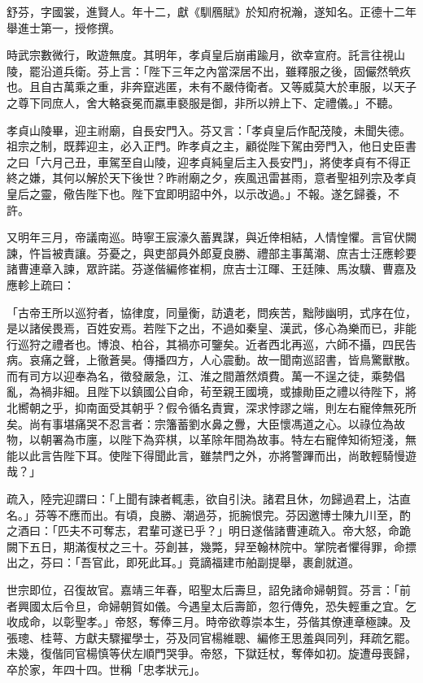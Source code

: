 \begin{pinyinscope}
舒芬，字國裳，進賢人。年十二，獻《馴鴈賦》於知府祝瀚，遂知名。正德十二年舉進士第一，授修撰。

時武宗數微行，畋遊無度。其明年，孝貞皇后崩甫踰月，欲幸宣府。託言往視山陵，罷沿道兵衛。芬上言：「陛下三年之內當深居不出，雖釋服之後，固儼然煢疚也。且自古萬乘之重，非奔竄逃匿，未有不嚴侍衛者。又等威莫大於車服，以天子之尊下同庶人，舍大輅袞冕而羸車褻服是御，非所以辨上下、定禮儀。」不聽。

孝貞山陵畢，迎主祔廟，自長安門入。芬又言：「孝貞皇后作配茂陵，未聞失德。祖宗之制，既葬迎主，必入正門。昨孝貞之主，顧從陛下駕由旁門入，他日史臣書之曰「六月己丑，車駕至自山陵，迎孝貞純皇后主入長安門」，將使孝貞有不得正終之嫌，其何以解於天下後世？昨祔廟之夕，疾風迅雷甚雨，意者聖祖列宗及孝貞皇后之靈，儆告陛下也。陛下宜即明詔中外，以示改過。」不報。遂乞歸養，不許。

又明年三月，帝議南巡。時寧王宸濠久蓄異謀，與近倖相結，人情惶懼。言官伏闕諫，忤旨被責讓。芬憂之，與吏部員外郎夏良勝、禮部主事萬潮、庶吉士汪應軫要諸曹連章入諫，眾許諾。芬遂偕編修崔桐，庶吉士江暉、王廷陳、馬汝驥、曹嘉及應軫上疏曰：

「古帝王所以巡狩者，協律度，同量衡，訪遺老，問疾苦，黜陟幽明，式序在位，是以諸侯畏焉，百姓安焉。若陛下之出，不過如秦皇、漢武，侈心為樂而已，非能行巡狩之禮者也。博浪、柏谷，其禍亦可鑒矣。近者西北再巡，六師不攝，四民告病。哀痛之聲，上徹蒼昊。傳播四方，人心震動。故一聞南巡詔書，皆鳥驚獸散。而有司方以迎奉為名，徵發嚴急，江、淮之間蕭然煩費。萬一不逞之徒，乘勢倡亂，為禍非細。且陛下以鎮國公自命，茍至親王國境，或據勛臣之禮以待陛下，將北嚮朝之乎，抑南面受其朝乎？假令循名責實，深求悖謬之端，則左右寵倖無死所矣。尚有事堪痛哭不忍言者：宗籓蓄劉水鼻之釁，大臣懷馮道之心。以祿位為故物，以朝署為市廛，以陛下為弈棋，以革除年間為故事。特左右寵倖知術短淺，無能以此言告陛下耳。使陛下得聞此言，雖禁門之外，亦將警蹕而出，尚敢輕騎慢遊哉？」

疏入，陸完迎謂曰：「上聞有諫者輒恚，欲自引決。諸君且休，勿歸過君上，沽直名。」芬等不應而出。有頃，良勝、潮過芬，扼腕恨完。芬因邀博士陳九川至，酌之酒曰：「匹夫不可奪志，君輩可遂已乎？」明日遂偕諸曹連疏入。帝大怒，命跪闕下五日，期滿復杖之三十。芬創甚，幾斃，舁至翰林院中。掌院者懼得罪，命摽出之，芬曰：「吾官此，即死此耳。」竟謫福建市舶副提舉，裹創就道。

世宗即位，召復故官。嘉靖三年春，昭聖太后壽旦，詔免諸命婦朝賀。芬言：「前者興國太后令旦，命婦朝賀如儀。今遇皇太后壽節，忽行傳免，恐失輕重之宜。乞收成命，以彰聖孝。」帝怒，奪俸三月。時帝欲尊崇本生，芬偕其僚連章極諫。及張璁、桂萼、方獻夫驟擢學士，芬及同官楊維聰、編修王思羞與同列，拜疏乞罷。未幾，復偕同官楊慎等伏左順門哭爭。帝怒，下獄廷杖，奪俸如初。旋遭母喪歸，卒於家，年四十四。世稱「忠孝狀元」。


\end{pinyinscope}
